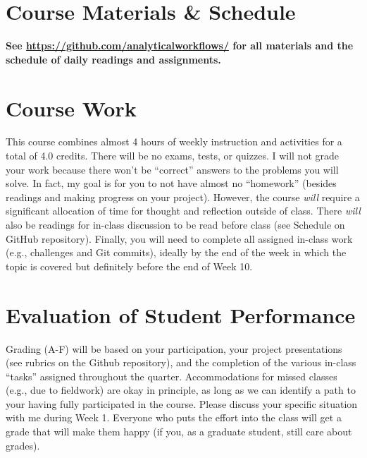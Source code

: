 \documentclass[10pt]{article}
\begin{document}
\section*{Course Materials \& Schedule}
\noindent
\begin{center}
\textbf{See
\href{https://github.com/analyticalworkflows}{https://github.com/analyticalworkflows/}
 for all materials and the schedule of daily readings and assignments.}
\end{center}

\section*{Course Work}
This course combines almost 4 hours of weekly instruction and activities for a total of 4.0 credits.
There will be no exams, tests, or quizzes.
I will not grade your work because there won't be ``correct'' answers to the problems you will
solve.
In fact, my goal is for you to not have almost no ``homework'' (besides readings and making progress
on your project).
However, the course \textit{will} require a significant allocation of time for thought and reflection outside
of class.
There \textit{will} also be readings for in-class discussion to be read before class (see Schedule on GitHub repository).
Finally, you will need to complete all assigned in-class work (e.g., challenges and Git commits), ideally
by the end of the week in which the topic is covered but definitely before the end of Week 10.

\section*{Evaluation of Student Performance}
Grading (A-F) will be based on your participation, your project presentations (see rubrics on the Github repository),
and the completion of the various in-class ``tasks'' assigned throughout the quarter.
Accommodations for missed classes (e.g., due to fieldwork) are okay in principle, as long as we can identify a path to your having fully participated in the course.
Please discuss your specific situation with me during Week 1.
Everyone who puts the effort into the class will get a grade that will make them happy (if you, as a graduate student, still care about grades).
\end{document}
